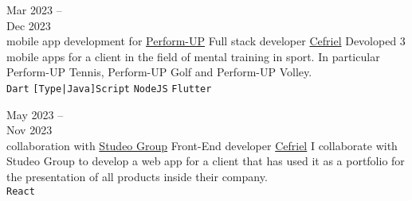 \documentclass[9pt]{developercv} %
\begin{document}
	
	



\begin{entrylist}
	\entry
	{Mar 2023 -- \\Dec 2023\\\footnotesize{mobile app development for \href{https://www.perform-up.com/}{Perform-UP}}}
	{Full stack developer}
	{\href{https://www.cefriel.com/}{Cefriel}}
	{
		Devoloped 3 mobile apps for a client in the field of mental training in sport. In particular Perform-UP Tennis, Perform-UP Golf and Perform-UP Volley.
		\\
		\texttt{Dart}\slashsep
		\texttt{[Type|Java]Script}\slashsep
		\texttt{NodeJS}\slashsep
		\texttt{Flutter}\slashsep
	}
\end{entrylist}

\begin{entrylist}
	\entry
	{May 2023 -- \\Nov 2023\\\footnotesize{collaboration with \href{https://www.studeogroup.it/}{Studeo Group}}}
	{Front-End developer}
	{\href{https://www.cefriel.com/}{Cefriel}}
	{
		I collaborate with Studeo Group to develop a web app for a client that has used it as a portfolio for the presentation of all products inside their company. 
		\\
		\texttt{React}\slashsep
	}
\end{entrylist}
\end{document}

